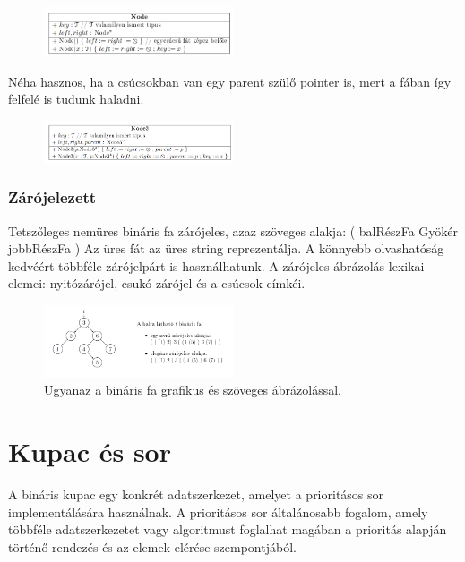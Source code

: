 \documentclass[margin=0px]{article}
\begin{document}
\begin{figure}[H]
    \centering
    \includegraphics[width=0.5\textwidth]{img/absztrakt_node.png}
\end{figure}

Néha hasznos, ha a csúcsokban van egy parent szülő pointer is, mert a fában
így felfelé is tudunk haladni.
\begin{figure}[H]
    \centering
    \includegraphics[width=0.5\textwidth]{img/absz_node_parenttel.png}
\end{figure}

\subsubsection{Zárójelezett}

Tetszőleges nemüres bináris fa zárójeles, azaz szöveges alakja:
    ( balRészFa Gyökér jobbRészFa )
Az üres fát az üres string reprezentálja. A könnyebb olvashatóság kedvéért
többféle zárójelpárt is használhatunk. A zárójeles ábrázolás lexikai elemei:
nyitózárójel, csukó zárójel és a csúcsok címkéi.
\begin{figure}[H]
    \centering
    \includegraphics[width=0.5\textwidth]{img/grafikus_szoveges.png}
    \caption{Ugyanaz a bináris fa grafikus és szöveges ábrázolással.}
\end{figure}

\section{Kupac és sor}
A bináris kupac egy konkrét adatszerkezet,
amelyet a prioritásos sor implementálására használnak.
A prioritásos sor általánosabb fogalom, amely többféle adatszerkezetet
vagy algoritmust foglalhat magában a prioritás alapján történő rendezés 
és az elemek elérése szempontjából.
\end{document}
